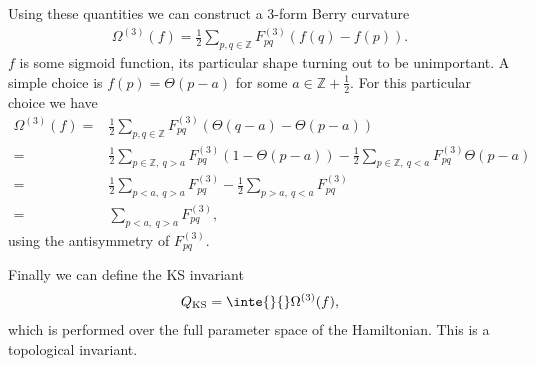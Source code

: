 Using these quantities we can construct a 3-form Berry curvature
\begin{align*}
	\Omega^{(3)}(f) = \frac{1}{2}\sum\limits_{p, q\in\mathbb{Z}}F^{(3)}_{pq}(f(q) - f(p)).
\end{align*}
$f$ is some sigmoid function, its particular shape turning out to be unimportant. A simple choice is $f(p) = \Theta(p - a)$ for some $a\in\mathbb{Z} + \frac{1}{2}$. For this particular choice we have
\begin{align*}
	\Omega^{(3)}(f) =& \frac{1}{2}\sum\limits_{p, q\in\mathbb{Z}}F^{(3)}_{pq}(\Theta(q - a) - \Theta(p - a)) \\
	                =& \frac{1}{2}\sum\limits_{p\in\mathbb{Z},\ q > a}F^{(3)}_{pq}(1 - \Theta(p - a)) - \frac{1}{2}\sum\limits_{p\in\mathbb{Z},\ q < a}F^{(3)}_{pq}\Theta(p - a) \\
	                =& \frac{1}{2}\sum\limits_{p < a,\ q > a}F^{(3)}_{pq} - \frac{1}{2}\sum\limits_{p > a,\ q < a}F^{(3)}_{pq} \\
	                =& \sum\limits_{p < a,\ q > a}F^{(3)}_{pq},
\end{align*}
using the antisymmetry of $F^{(3)}_{pq}$.

Finally we can define the KS invariant
\begin{align*}
	Q_{\text{KS}} = \inte{}{}\Omega^{(3)}(f),
\end{align*}
which is performed over the full parameter space of the Hamiltonian. This is a topological invariant.

